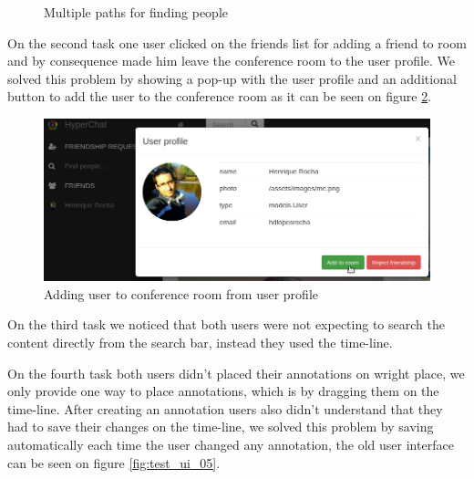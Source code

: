 \begin{figure}[!htb]
    \caption{Multiple paths for finding people}
    \label{fig:test_ui_01_02_03}
\end{figure}

On the second task one user clicked on the friends list for adding a friend to room and by consequence made him leave the conference room to the user profile. We solved this problem by showing a pop-up with the user profile and an additional button to add the user to the conference room as it can be seen on figure \ref{fig:test_ui_04}.

\begin{figure}[!htb]
\centering
\begin{minipage}[b]{0.7\linewidth}
\centering

    \includegraphics[width=\textwidth]{figures/test_ui_04.png}
\end{minipage}


    \caption{Adding user to conference room from user profile}
    \label{fig:test_ui_04}
\end{figure}

On the third task we noticed that both users were not expecting to search the content directly from the search bar, instead they used the time-line.

On the fourth task both users didn't placed their annotations on wright place, we only provide one way to place annotations, which is by dragging them on the time-line. 
After creating an annotation users also didn't understand that they had to save their changes on the time-line, we solved this problem by saving automatically each time the user changed any annotation, the old user interface can be seen on figure \ref{fig:test_ui_05}.

